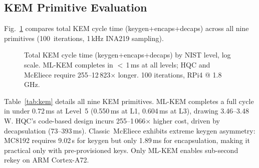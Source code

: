 \subsection{KEM Primitive Evaluation}
\label{sec:kem}

Fig.~\ref{fig:kem_cost} compares total KEM cycle time
(keygen+encaps+decaps) across all nine primitives (100~iterations,
1\,kHz INA219 sampling).

\begin{figure}[t]
\centering
{}
\caption{Total KEM cycle time (keygen+encaps+decaps) by NIST level,
  log scale.  ML-KEM completes in $<$\,1\,ms at all levels; HQC and
  McEliece require 255--12\,823$\times$ longer.  100 iterations,
  RPi4 @ 1.8\,GHz.}
\label{fig:kem_cost}
\end{figure}

Table~\ref{tab:kem} details all nine KEM primitives.
ML-KEM completes a full cycle in under 0.72\,ms at Level~5
(0.550\,ms at L1, 0.604\,ms at L3), drawing 3.46--3.48\,W.
HQC's code-based design incurs 255--1\,066$\times$ higher cost,
driven by decapsulation (73--393\,ms).
Classic~McEliece exhibits extreme keygen asymmetry: MC8192 requires
9.02\,s for keygen but only 1.89\,ms for encapsulation,
making it practical only with pre-provisioned keys.
Only ML-KEM enables sub-second rekey on ARM Cortex-A72.

